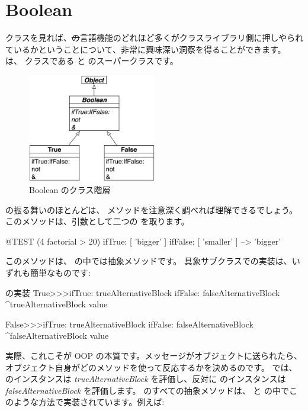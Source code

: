 \documentclass[a4paper,10pt,twoside]{book}
\begin{document}
\section{Boolean}

 クラスを見れば、\st の言語機能のどれほど多くがクラスライブラリ側に押しやられているかということについて、非常に興味深い洞察を得ることができます。 は、 クラスである  と  のスーパークラスです。

\begin{figure}[ht]
  {\centerline {\includegraphics[width=0.5\textwidth]{BooleanHierarchy}}}
\caption{Boolean のクラス階層 }
\end{figure}

 の振る舞いのほとんどは、 メソッドを注意深く調べれば理解できるでしょう。このメソッドは、引数として二つの  を取ります。

\begin{code}{@TEST}
(4 factorial > 20) ifTrue: [ 'bigger' ] ifFalse: [ 'smaller' ] --> 'bigger'
\end{code}

このメソッドは、 の中では抽象メソッドです。
具象サブクラスでの実装は、いずれも簡単なものです:

\begin{method}{ の実装}
True>>>ifTrue: trueAlternativeBlock ifFalse: falseAlternativeBlock 
    ^trueAlternativeBlock value

False>>>ifTrue: trueAlternativeBlock ifFalse: falseAlternativeBlock 
    ^falseAlternativeBlock value
\end{method}

実際、これこそが OOP の本質です。メッセージがオブジェクトに送られたら、オブジェクト自身がどのメソッドを使って反応するかを決めるのです。 では、 のインスタンスは \emph{trueAlternativeBlock} を評価し、反対に  のインスタンスは \emph{falseAlternativeBlock} を評価します。 のすべての抽象メソッドは、 と  の中でこのような方法で実装されています。例えば:
\end{document}
